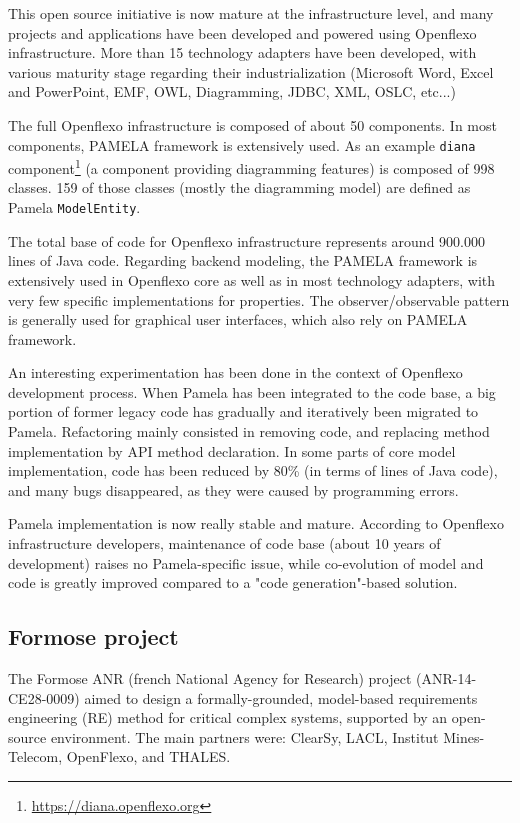 This open source initiative is now mature at the infrastructure level, and many
projects and applications have been developed and powered using Openflexo
infrastructure. More than 15 technology adapters have been developed, with
various maturity stage regarding their industrialization (Microsoft Word, Excel
and PowerPoint, EMF, OWL, Diagramming, JDBC, XML, OSLC, etc...)

The full Openflexo infrastructure is composed of about 50 components. In most components, PAMELA framework is extensively used. As an example \texttt{diana} component\footnote{\url{https://diana.openflexo.org}} (a component providing diagramming features) is composed of 998 classes. 159 of those classes (mostly the diagramming model) are defined as Pamela \texttt{ModelEntity}. 

The total base of code for Openflexo infrastructure represents around 900.000
lines of Java code. Regarding backend modeling, the PAMELA framework is
extensively used in Openflexo core as well as in most technology adapters, with
very few specific implementations for properties. The observer/observable
pattern is generally used for graphical user interfaces, which also rely on
PAMELA framework. 

An interesting experimentation has been done in the context of Openflexo development process. When Pamela has been integrated to the code base, a big portion of former legacy code has gradually and iteratively been migrated to Pamela. Refactoring mainly consisted in removing code, and replacing method implementation by API method declaration. In some parts of core model implementation, code has been reduced by 80\% (in terms of lines of Java code), and many bugs disappeared, as they were caused by programming errors.

Pamela implementation is now really stable and mature. According to Openflexo infrastructure developers, maintenance of code base (about 10 years of development) raises no Pamela-specific issue, while co-evolution of model and code is greatly improved compared to a "code generation"-based solution.


\subsection{Formose project}

The Formose ANR (french National Agency for Research) project
(ANR-14-CE28-0009)\cite{FormoseWebSite} aimed to design a formally-grounded,
model-based requirements engineering (RE) method for critical complex systems,
supported by an open-source environment. The main partners were: ClearSy, LACL,
Institut Mines-Telecom, OpenFlexo, and THALES. 

